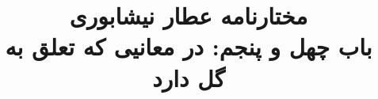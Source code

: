 \documentclass[14pt,b5paper]{article}
\begin{document}
\title{\Huge مختارنامه عطار نیشابوری \\
باب چهل و پنجم: در معانیی که تعلق به گل دارد}
\author{ }
\date{ }
\maketitle
\newpage
\tableofcontents
\newpage

\newpage

\newpage

\newpage

\newpage

\newpage

\newpage

\newpage

\newpage

\newpage

\newpage

\newpage

\newpage

\newpage

\newpage

\newpage

\newpage

\newpage

\newpage

\newpage

\newpage

\newpage

\newpage

\newpage

\newpage

\newpage

\newpage

\newpage

\newpage

\newpage

\newpage

\newpage

\newpage

\newpage

\newpage

\newpage

\newpage

\newpage

\newpage

\newpage

\newpage

\newpage

\newpage

\newpage

\newpage

\newpage

\newpage

\newpage

\newpage

\newpage

\newpage

\newpage

\newpage

\newpage

\newpage

\newpage

\newpage

\newpage
\end{document}

